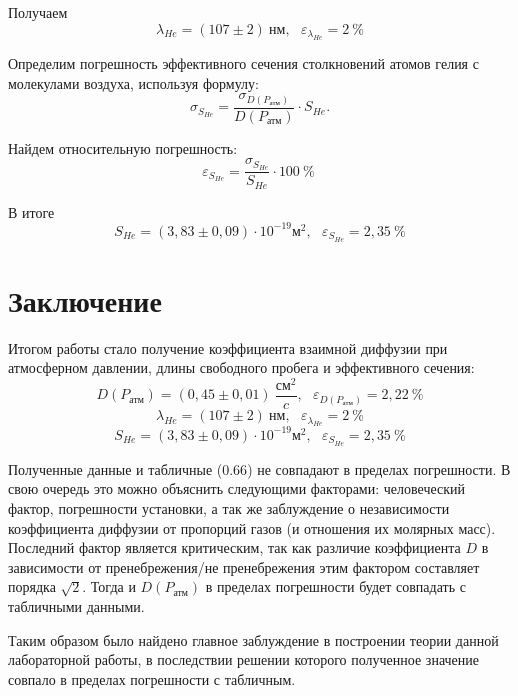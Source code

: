 \documentclass[a4paper,12pt]{article}
\begin{document}
Получаем
\begin{equation}
	\lambda_{He} = (107 \pm 2)\ \text{нм}, \ ~ \ \varepsilon_{\lambda_{He}} = 2\ \%
\end{equation}


Определим погрешность эффективного сечения столкновений атомов гелия с молекулами воздуха, используя формулу:  
\begin{equation}
	\sigma_{S_{He}} = \dfrac{\sigma_{D(P_{\text{атм}})}}{D(P_{\text{атм}})} \cdot S_{He}.
\end{equation}

Найдем относительную погрешность:
\begin{equation}
	\varepsilon_{S_{He}} = \dfrac{\sigma_{S_{He}}}{S_{He}}\cdot 100\ \%\ 
\end{equation}

В итоге
\begin{equation}
	S_{He} = (3,83 \pm 0,09) \cdot 10^{-19} \text{м}^2,\ ~ \  \varepsilon_{S_{He}} = 2,35\ \%
\end{equation}
\newpage

\section{Заключение}

Итогом работы стало получение коэффициента взаимной диффузии при атмосферном давлении, длины свободного пробега и эффективного сечения:
\[D(P_{\text{атм}}) = (0,45 \pm 0,01)\ \frac{\text{см}^2}{c}, \ ~ \ \varepsilon_{D(P_{\text{атм}})} = 2,22\ \% \]
\[\lambda_{He} = (107 \pm 2)\ \text{нм}, \ ~ \ \varepsilon_{\lambda_{He}} = 2\ \%\]
\[S_{He} = (3,83 \pm 0,09) \cdot 10^{-19} \text{м}^2,\ ~ \  \varepsilon_{S_{He}} = 2,35\ \% \]
 
 
Полученные данные и табличные ($0.66$) не совпадают в пределах погрешности. В свою очередь это можно объяснить следующими факторами: человеческий фактор, погрешности установки, а так же заблуждение о независимости коэффициента диффузии от пропорций газов (и отношения их молярных масс). Последний фактор является критическим, так как различие коэффициента $D$ в зависимости от пренебрежения/не пренебрежения этим фактором составляет порядка $\sqrt{2}$. Тогда и $D(P_{\text{атм}})$ в пределах погрешности будет совпадать с табличными данными.

Таким образом было найдено главное заблуждение в построении теории данной лабораторной работы, в последствии решении которого полученное значение совпало в пределах погрешности с табличным.
\end{document}
